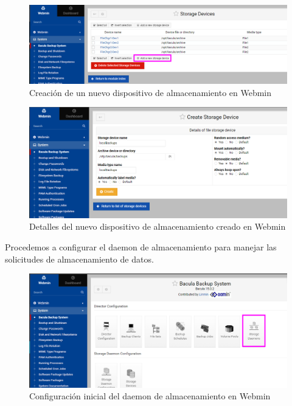 \begin{minipage}[t]{0.45\textwidth}
    \vspace{0pt} %
    \begin{figure}[H]
        \centering
        \includegraphics[width=0.95\linewidth]{instalacionBacula/NSD.png}
        \caption{Creación de un nuevo dispositivo de almacenamiento en Webmin}
    \end{figure}    
    \end{minipage}%
    \hfill %
    \begin{minipage}[t]{0.45\textwidth}
    \vspace{0pt} %
    \centering %
        \begin{figure}[H]
            \centering
            \includegraphics[width=0.95\linewidth]{instalacionBacula/localbac.png}
            \caption{Detalles del nuevo dispositivo de almacenamiento creado en Webmin}
        \end{figure}
    \end{minipage}
    
\medskip





Procedemos a configurar el daemon de almacenamiento para manejar las solicitudes de almacenamiento de datos.

\begin{figure}[H]
    \centering
    \includegraphics[width=0.5\linewidth]{instalacionBacula/stdeamon.png}
    \caption{Configuración inicial del daemon de almacenamiento en Webmin}
\end{figure}


